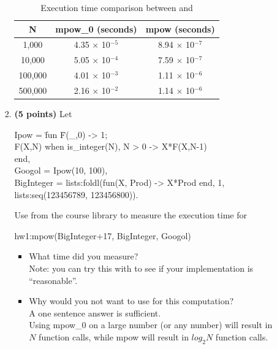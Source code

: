 \documentclass{article}
\newenvironment{answer}
{\color{blue}}
{\normalfont}
\begin{document}
\begin{enumerate}
\begin{enumerate}
\begin{enumerate}
      \begin{table}[H]
	    \centering
	    \caption*{Execution time comparison between  and }
	    \begin{tabular}{|c|c|c|}
	    \hline
	    \textbf{N} & \textbf{mpow\_0 (seconds)} & \textbf{mpow (seconds)} \\
	    \hline
	    1,000 & 4.35 $\times$ 10$^{-5}$ & 8.94 $\times$ 10$^{-7}$ \\
	    \hline
	    10,000 & 5.05 $\times$ 10$^{-4}$ & 7.59 $\times$ 10$^{-7}$ \\
	    \hline
	    100,000 & 4.01 $\times$ 10$^{-3}$ & 1.11 $\times$ 10$^{-6}$ \\
	    \hline
	    500,000 & 2.16 $\times$ 10$^{-2}$ & 1.14 $\times$ 10$^{-6}$ \\
	    \hline
	    \end{tabular}
	    \end{table}

	  \item \textbf{(5 points)} Let\\
	    \begin{xcode}
	      Ipow = \=fun \=F(\_,0) -> 1;\\
			   \>F(X,N) when is\_integer(N), N > 0 -> X*F(X,N-1)\\
		     \>end,\\
	      Googol = Ipow(10, 100),\\
	      BigInteger = lists:foldl(fun(X, Prod) -> X*Prod end, 1, lists:seq(123456789, 123456800)).
	    \end{xcode}
	    Use  from the course library to measure the execution time for
	    \begin{xcode}
	      hw1:mpow(BigInteger+17, BigInteger, Googol)
	    \end{xcode}
	    \begin{itemize}
	      \item What time did you measure?\\
		Note: you can try this with  to see if your implementation is
		``reasonable''.\\ 
	      \item Why would you not want to use  for this computation?\\
		A one sentence answer is sufficient. \\
        \begin{answer}
        Using mpow\_0 on a large number (or any number) will result in $N$ function calls, while mpow will result in $log_2N$ function calls.
        \end{answer}
	    \end{itemize}
	\end{enumerate}
    \end{enumerate}


\end{enumerate}
\end{document}
